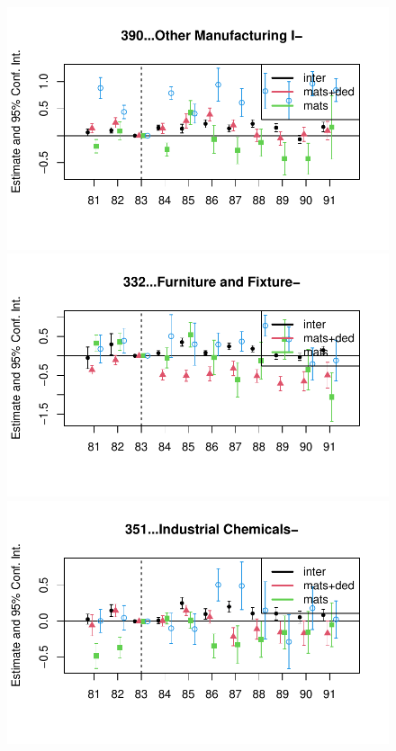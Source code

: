 \documentclass[
  12pt]{article}
\theoremstyle{definition}
\theoremstyle{remark}
\begin{document}
\begin{figure}
\begin{minipage}{\linewidth}
\includegraphics{Tax-Prod_files/figure-pdf/unnamed-chunk-11-12.pdf}

\includegraphics{Tax-Prod_files/figure-pdf/unnamed-chunk-11-13.pdf}

\includegraphics{Tax-Prod_files/figure-pdf/unnamed-chunk-11-14.pdf}


\end{minipage}
\end{figure}
\end{document}
